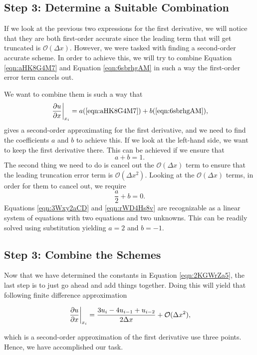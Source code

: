 \subsection{Step 3: Determine a Suitable Combination}
If we look at the previous two expressions for the first derivative, we will notice that they are both first-order accurate since the leading term that will get truncated is $\mathcal{O}(\Delta x)$. However, we were tasked with finding a second-order accurate scheme. In order to achieve this, we will try to combine Equation \ref{eqn:aHK8G4M7} and Equation \ref{eqn:6sbrhgAM} in such a way the first-order error term cancels out.

We want to combine them is such a way that
\begin{equation}
	\left.\frac{\partial u}{\partial x}\right\rvert_{x_i}^{} = a(\ref{eqn:aHK8G4M7}) + b(\ref{eqn:6sbrhgAM}),
	\label{eqn:2KGWrZa5}
\end{equation}
gives a second-order approximating for the first derivative, and we need to find the coefficients $a$ and $b$ to achieve this. If we look at the left-hand side, we want to keep the first derivative there. This can be achieved if we ensure that
\begin{equation}
	a + b = 1.
	\label{eqn:3Wxy2aCD}
\end{equation}
The second thing we need to do is cancel out the $\mathcal{O}(\Delta x)$ term to ensure that the leading truncation error term is $\mathcal{O}(\Delta x^2)$. Looking at the $\mathcal{O}(\Delta x)$ terms, in order for them to cancel out, we require
\begin{equation}
	\frac{a}{2} + b = 0.
	\label{eqn:rWD4Hs8v}
\end{equation}
Equations \ref{eqn:3Wxy2aCD} and \ref{eqn:rWD4Hs8v} are recognizable as a linear system of equations with two equations and two unknowns. This can be readily solved using substitution yielding $a=2$ and $b=-1$.

\subsection{Step 3: Combine the Schemes}
Now that we have determined the constants in Equation \ref{eqn:2KGWrZa5}, the last step is to just go ahead and add things together. Doing this will yield that following finite difference approximation
\begin{eqBox}
\begin{equation}
	\left.\frac{\partial u}{\partial x}\right\rvert_{x_i}^{} = \frac{3u_i - 4u_{i-1} + u_{i-2}}{2 \Delta x} + \mathcal{O}(\Delta x^2),
	\label{eqn:aHK8G4M7_2}
\end{equation}
\end{eqBox}
which is a second-order approximation of the first derivative use three points. Hence, we have accomplished our task.

